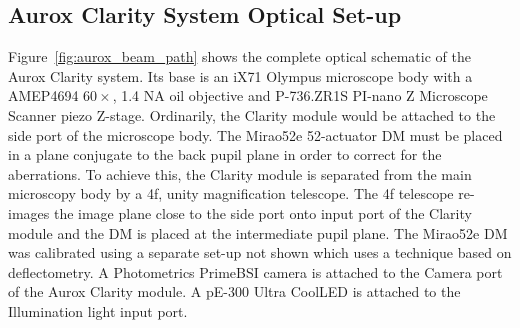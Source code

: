 \subsection{Aurox Clarity System Optical Set-up}
\label{subsec:aurox_optics}

Figure~\ref{fig:aurox_beam_path} shows the complete optical schematic of the Aurox Clarity system. Its base is an iX71 Olympus microscope body with a AMEP4694 $60\times$, 1.4 NA oil objective and P-736.ZR1S PI-nano Z Microscope Scanner piezo Z-stage. Ordinarily, the Clarity module would be attached to the side port of the microscope body. The Mirao52e 52-actuator DM must be placed in a plane conjugate to the back pupil plane in order to correct for the aberrations. To achieve this, the Clarity module is separated from the main microscopy body by a 4f, unity magnification telescope. The 4f telescope re-images the image plane close to the side port onto input port of the Clarity module and the DM is placed at the intermediate pupil plane. The Mirao52e DM was calibrated using a separate set-up not shown which uses a technique based on deflectometry\cite{trumper2016instantaneous,huang2017close}. A Photometrics PrimeBSI camera is attached to the Camera port of the Aurox Clarity module. A pE-300 Ultra CoolLED is attached to the Illumination light input port.

